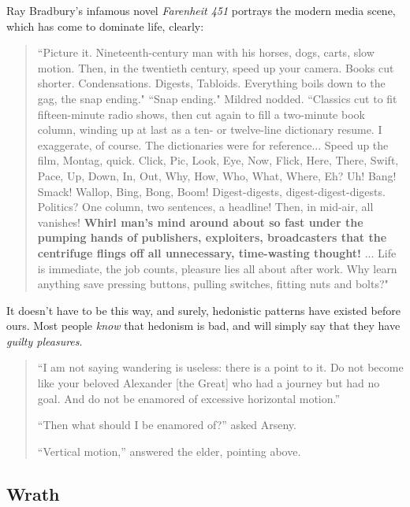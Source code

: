 \documentclass[letterpaper]{article}
\begin{document}
Ray Bradbury's infamous novel \textit{Farenheit 451} portrays the modern media scene, which has come to dominate life, clearly:

\begin{quote}
  ``Picture it. Nineteenth-century man with his horses, dogs, carts, slow motion. Then, in the twentieth century, speed up your camera. Books cut shorter. Condensations. Digests, Tabloids. Everything boils down to the gag, the snap ending." ``Snap ending." Mildred nodded. ``Classics cut to fit fifteen-minute radio shows, then cut again to fill a two-minute book column, winding up at last as a ten- or twelve-line dictionary resume. I exaggerate, of course. The dictionaries were for reference... Speed up the film, Montag, quick. Click, Pic, Look, Eye, Now, Flick, Here, There, Swift, Pace, Up, Down, In, Out, Why, How, Who, What, Where, Eh? Uh! Bang! Smack! Wallop, Bing, Bong, Boom! Digest-digests, digest-digest-digests. Politics? One column, two sentences, a headline! Then, in mid-air, all vanishes! \textbf{Whirl man’s mind around about so fast under the pumping hands of publishers, exploiters, broadcasters that the centrifuge flings off all unnecessary, time-wasting thought!} ... Life is immediate, the job counts, pleasure lies all about after work. Why learn anything save pressing buttons, pulling switches, fitting nuts and bolts?"
\end{quote}

It doesn't have to be this way, and surely, hedonistic patterns have existed before ours. Most people \textit{know} that hedonism is bad, and will simply say that they have \textit{guilty pleasures}. 

\begin{quote}
  ``I am not saying wandering is useless: there is a point to it. Do not become like your beloved Alexander [the Great] who had a journey but had no goal. And do not be enamored of excessive horizontal motion.''

  ``Then what should I be enamored of?'' asked Arseny.

  ``Vertical motion,'' answered the elder, pointing above.
\end{quote}

\subsection{Wrath}
\end{document}
